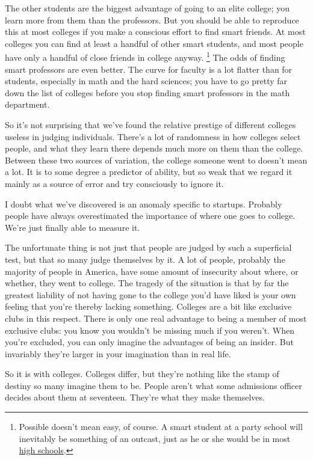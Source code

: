 \documentclass[12pt]{book}
\begin{document}
The other students are the biggest advantage of going to an elite
college; you learn more from them than the professors. But you should be
able to reproduce this at most colleges if you make a conscious effort
to find smart friends. At most colleges you can find at least a handful
of other smart students, and most people have only a handful of close
friends in college anyway. \footnote{Possible doesn't mean easy, of course. A smart student at a
party school will inevitably be something of an outcast, just as he or
she would be in most \href{nerds.html}{high schools}.} The odds of finding
smart professors are even better. The curve for faculty is a lot flatter
than for students, especially in math and the hard sciences; you have to
go pretty far down the list of colleges before you stop finding smart
professors in the math department.

So it's not surprising that we've found the relative prestige of
different colleges useless in judging individuals. There's a lot of
randomness in how colleges select people, and what they learn there
depends much more on them than the college. Between these two sources of
variation, the college someone went to doesn't mean a lot. It is to some
degree a predictor of ability, but so weak that we regard it mainly as a
source of error and try consciously to ignore it.

I doubt what we've discovered is an anomaly specific to startups.
Probably people have always overestimated the importance of where one
goes to college. We're just finally able to measure it.

The unfortunate thing is not just that people are judged by such a
superficial test, but that so many judge themselves by it. A lot of
people, probably the majority of people in America, have some amount of
insecurity about where, or whether, they went to college. The tragedy of
the situation is that by far the greatest liability of not having gone
to the college you'd have liked is your own feeling that you're thereby
lacking something. Colleges are a bit like exclusive clubs in this
respect. There is only one real advantage to being a member of most
exclusive clubs: you know you wouldn't be missing much if you weren't.
When you're excluded, you can only imagine the advantages of being an
insider. But invariably they're larger in your imagination than in real
life.

So it is with colleges. Colleges differ, but they're nothing like the
stamp of destiny so many imagine them to be. People aren't what some
admissions officer decides about them at seventeen. They're what they
make themselves.
\end{document}
